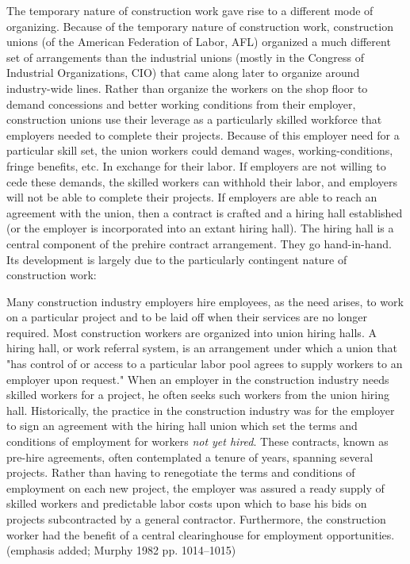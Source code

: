 \documentclass[12pt]{article}
\renewenvironment{quote}
  {\list{}{\leftmargin=\parindent\rightmargin=0pt}%
   \item\relax}
  {\endlist}
\begin{document}
The temporary nature of construction work gave rise to a different mode of organizing. Because of the temporary nature of construction work, construction unions (of the American Federation of Labor, AFL) organized a much different set of arrangements than the industrial unions (mostly in the Congress of Industrial Organizations, CIO) that came along later to organize around industry-wide lines. Rather than organize the workers on the shop floor to demand concessions and better working conditions from their employer, construction unions use their leverage as a particularly skilled workforce that employers needed to complete their projects. Because of this employer need for a particular skill set, the union workers could demand wages, working-conditions, fringe benefits, etc. In exchange for their labor. If employers are not willing to cede these demands, the skilled workers can withhold their labor, and employers will not be able to complete their projects. If employers are able to reach an agreement with the union, then a contract is crafted and a hiring hall established (or the employer is incorporated into an extant hiring hall). The hiring hall is a central component of the prehire contract arrangement. They go hand-in-hand. Its development is largely due to the particularly contingent nature of construction work:

\begin{quote}
Many construction industry employers hire employees, as the need arises, to work on a particular project and to be laid off when their services are no longer required. Most construction workers are organized into union hiring halls. A hiring hall, or work referral system, is an arrangement under which a union that "has control of or access to a particular labor pool agrees to supply workers to an employer upon request." When an employer in the construction industry needs skilled workers for a project, he often seeks such workers from the union hiring hall. Historically, the practice in the construction industry was for the employer to sign an agreement with the hiring hall union which set the terms and conditions of employment for workers \textit{not yet hired}. These contracts, known as pre-hire agreements, often contemplated a tenure of years, spanning several projects. Rather than having to renegotiate the terms and conditions of employment on each new project, the employer was assured a ready supply of skilled workers and predictable labor costs upon which to base his bids on projects subcontracted by a general contractor. Furthermore, the construction worker had the benefit of a central clearinghouse for employment opportunities. (emphasis added; Murphy 1982 pp. 1014–1015)
\end{quote}
\end{document}
